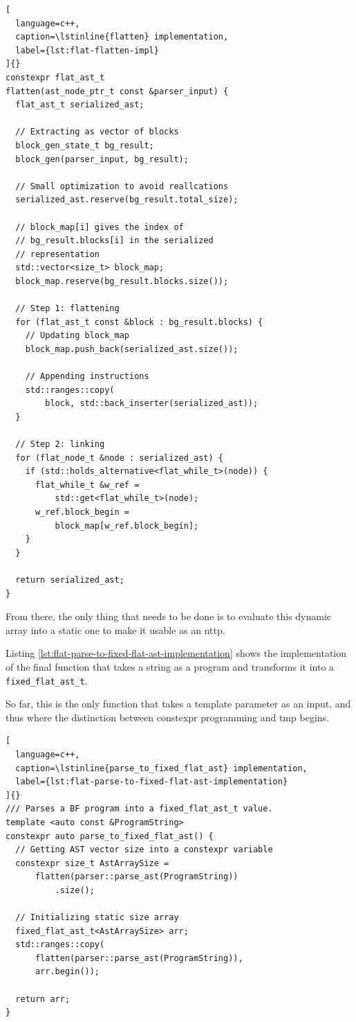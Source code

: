 \documentclass[../main]{subfiles}
\begin{document}
\begin{lstlisting}[
  language=c++,
  caption=\lstinline{flatten} implementation,
  label={lst:flat-flatten-impl}
]{}
constexpr flat_ast_t
flatten(ast_node_ptr_t const &parser_input) {
  flat_ast_t serialized_ast;

  // Extracting as vector of blocks
  block_gen_state_t bg_result;
  block_gen(parser_input, bg_result);

  // Small optimization to avoid reallcations
  serialized_ast.reserve(bg_result.total_size);

  // block_map[i] gives the index of
  // bg_result.blocks[i] in the serialized
  // representation
  std::vector<size_t> block_map;
  block_map.reserve(bg_result.blocks.size());

  // Step 1: flattening
  for (flat_ast_t const &block : bg_result.blocks) {
    // Updating block_map
    block_map.push_back(serialized_ast.size());

    // Appending instructions
    std::ranges::copy(
        block, std::back_inserter(serialized_ast));
  }

  // Step 2: linking
  for (flat_node_t &node : serialized_ast) {
    if (std::holds_alternative<flat_while_t>(node)) {
      flat_while_t &w_ref =
          std::get<flat_while_t>(node);
      w_ref.block_begin =
          block_map[w_ref.block_begin];
    }
  }

  return serialized_ast;
}
\end{lstlisting}


From there, the only thing that needs to be done is to evaluate this
dynamic array into a static one to make it usable as an \gls{nttp}.

Listing \ref{lst:flat-parse-to-fixed-flat-ast-implementation} shows the
implementation of the final function that takes a string as a program
and transforms it into a \lstinline{fixed_flat_ast_t}.

So far, this is the only function that takes a template parameter as an input,
and thus where the distinction between \gls{constexpr} programming and \gls{tmp}
begins.

\clearpage%

\begin{lstlisting}[
  language=c++,
  caption=\lstinline{parse_to_fixed_flat_ast} implementation,
  label={lst:flat-parse-to-fixed-flat-ast-implementation}
]{}
/// Parses a BF program into a fixed_flat_ast_t value.
template <auto const &ProgramString>
constexpr auto parse_to_fixed_flat_ast() {
  // Getting AST vector size into a constexpr variable
  constexpr size_t AstArraySize =
      flatten(parser::parse_ast(ProgramString))
          .size();

  // Initializing static size array
  fixed_flat_ast_t<AstArraySize> arr;
  std::ranges::copy(
      flatten(parser::parse_ast(ProgramString)),
      arr.begin());

  return arr;
}
\end{lstlisting}
\end{document}
